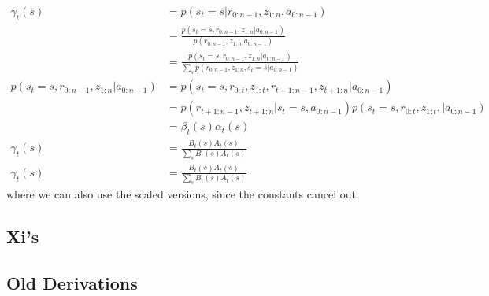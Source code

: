 \documentclass[10pt,english]{article}
\begin{document}
\begin{align}
\gamma_t(s) &= p(s_t = s | r_{0:n-1}, z_{1:n}, a_{0:n-1}) \\
&=  \frac{p(s_t = s, r_{0:n-1}, z_{1:n} | a_{0:n-1})}{p(r_{0:n-1}, z_{1:n} | a_{0:n-1})} \\
&=  \frac{p(s_t = s, r_{0:n-1}, z_{1:n} | a_{0:n-1})}{ \sum_s p(r_{0:n-1}, z_{1:n}, s_t = s | a_{0:n-1})} \\
p(s_t = s, r_{0:n-1}, z_{1:n} | a_{0:n-1}) &=  p(s_t = s, r_{0:t}, z_{1:t}, r_{t+1:n-1}, z_{t+1:n} | a_{0:n-1}) \\
&=  p(r_{t+1:n-1}, z_{t+1:n} | s_t = s, a_{0:n-1}) p(s_t = s, r_{0:t}, z_{1:t}, | a_{0:n-1}) \\
&=  \beta_t(s) \alpha_t(s) \\
\gamma_t(s) &=  \frac{B_t(s) A_t(s)}{ \sum_s B_t(s) A_t(s)} \\
\gamma_t(s) &=  \frac{B_t(s) A_t(s)}{ \sum_s B_t(s) A_t(s)}
\end{align}
where we can also use the scaled versions, since the constants cancel out.

\subsection{Xi's}



\subsection{Old Derivations}
\end{document}
